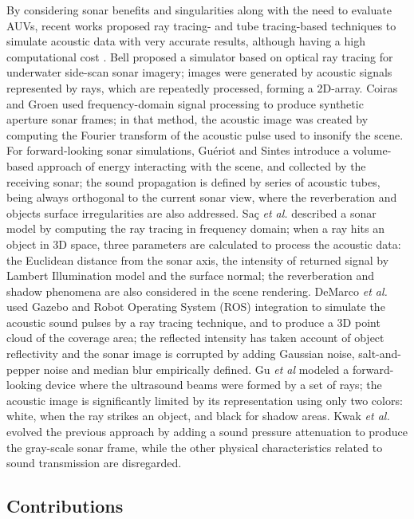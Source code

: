 \documentclass[final,5p,times]{elsarticle}
\begin{document}
By considering sonar benefits and singularities along with the need to
evaluate AUVs, recent works proposed ray tracing- and tube tracing-based
techniques to simulate acoustic data with very accurate results, although
having a high computational cost
\cite{bell1997,coiras2009,gueriot2010,sac2015,demarco2015,gu2013,kwak2015}.
Bell \cite{bell1997} proposed a simulator based on optical ray tracing for
underwater side-scan sonar imagery; images were generated by acoustic
signals represented by rays, which are repeatedly processed, forming a
2D-array. Coiras and Groen \cite{coiras2009} used frequency-domain
signal processing to produce synthetic aperture sonar frames; in that method,
the acoustic image was created by computing the Fourier transform of the
acoustic pulse used to insonify the scene. For forward-looking sonar
simulations, Guériot and Sintes \cite{gueriot2010} introduce a volume-based
approach of energy interacting with the scene, and collected by the receiving
sonar; the sound propagation is defined by series of acoustic tubes, being
always orthogonal to the current sonar view, where the reverberation and
objects surface irregularities are also addressed. Saç \textit{et al.}
\cite{sac2015} described a sonar model by computing the ray tracing in
frequency domain; when a ray hits an object in 3D space, three parameters
are calculated to process the acoustic data: the Euclidean distance from
the sonar axis, the intensity of returned signal by Lambert Illumination
model and the surface normal; the reverberation and shadow phenomena are
also considered in the scene rendering. DeMarco \textit{et al.}
\cite{demarco2015} used Gazebo and Robot Operating System (ROS)
\cite{quigley2009} integration to simulate the acoustic sound pulses by a
ray tracing technique, and to produce a 3D point cloud of the coverage area;
the reflected intensity has taken account of object reflectivity and the
sonar image is corrupted by adding Gaussian noise, salt-and-pepper noise
and median blur empirically defined. Gu \textit{et al} \cite{gu2013} modeled
a forward-looking device where the ultrasound beams were formed by a set of
rays; the acoustic image is significantly limited by its representation
using only two colors: white, when the ray strikes an object, and black for
shadow areas. Kwak \textit{et al.} \cite{kwak2015} evolved the previous
approach by adding a sound pressure attenuation to produce the gray-scale
sonar frame, while the other physical characteristics related to sound
transmission are disregarded.

\subsection{Contributions}
\end{document}
